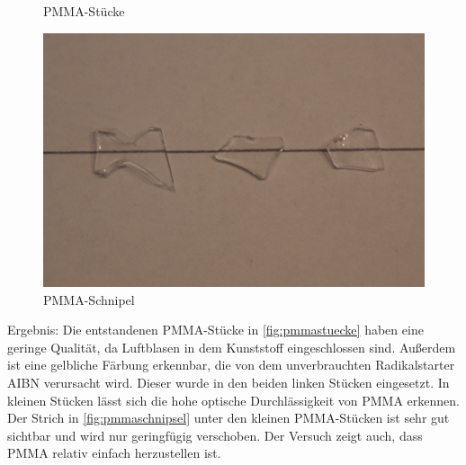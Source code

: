 \begin{figure}[h]
\begin{center}
\begin{minipage}[t]{0.3\textwidth}
\begin{center}
                \caption[PMMA-Stücke]{PMMA-Stücke}
                \label{fig:pmmastuecke}
            \end{center}
        \end{minipage}
        \hspace{0.025\textwidth}
        \begin{minipage}[t]{0.3\textwidth}
            \begin{center}
                \includegraphics[height=0.1\textheight]{Bilder/Optische_Wellenleiter_Die_Polymer_Optische_Faser/Material_Polycarbonat/pmmaschnipsel.png}
                \caption[PMMA-Schnipsel]{PMMA-Schnipel}
                \label{fig:pmmaschnipsel}
            \end{center}
        \end{minipage}
    \end{center}
\end{figure}

Ergebnis: Die entstandenen PMMA-Stücke in \autoref{fig:pmmastuecke} haben eine
geringe Qualität, da Luftblasen in dem Kunststoff eingeschlossen sind. Außerdem
ist eine gelbliche Färbung erkennbar, die von dem unverbrauchten Radikalstarter
AIBN verursacht wird. Dieser wurde in den beiden linken Stücken eingesetzt. In
kleinen Stücken lässt sich die hohe optische Durchlässigkeit von PMMA erkennen.
Der Strich in \autoref{fig:pmmaschnipsel} unter den kleinen PMMA-Stücken ist
sehr gut sichtbar und wird nur geringfügig verschoben. Der Versuch zeigt auch,
dass PMMA relativ einfach herzustellen ist.
